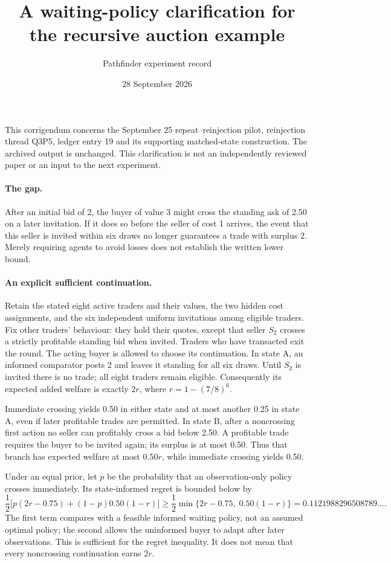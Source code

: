 \documentclass[11pt,a4paper]{article}
\title{A waiting-policy clarification for the recursive auction example}
\author{Pathfinder experiment record}
\date{28 September 2026}
\begin{document}
\maketitle
This corrigendum concerns the September 25 repeat--reinjection pilot,
reinjection thread Q3P5, ledger entry 19 and its supporting matched-state
construction. The archived output is unchanged. This clarification is not
an independently reviewed paper or an input to the next experiment.

\paragraph{The gap.}
After an initial bid of 2, the buyer of value 3 might cross the standing
ask of 2.50 on a later invitation. If it does so before the seller of
cost 1 arrives, the event that this seller is invited within six draws
no longer guarantees a trade with surplus 2. Merely requiring agents to
avoid losses does not establish the written lower bound.

\paragraph{An explicit sufficient continuation.}
Retain the stated eight active traders and their values, the two hidden
cost assignments, and the six independent uniform invitations among
eligible traders. Fix other traders' behaviour: they hold their quotes,
except that seller $S_2$ crosses a strictly profitable standing bid when
invited. Traders who have transacted exit the round.
The acting buyer is allowed to choose its continuation.
In state A, an informed comparator posts 2 and leaves it standing for all
six draws. Until $S_2$ is invited there is no trade; all eight traders
remain eligible. Consequently its expected added welfare is exactly
$2r$, where $r=1-(7/8)^6$.

Immediate crossing yields 0.50 in either state and at most another 0.25
in state A, even if later profitable trades are permitted. In state B,
after a noncrossing first action no seller can profitably cross a bid
below 2.50. A profitable trade requires the buyer to be invited again;
its surplus is at most 0.50. Thus that branch has expected welfare at
most $0.50r$, while immediate crossing yields 0.50.

Under an equal prior, let $p$ be the probability that an observation-only
policy crosses immediately. Its state-informed regret is bounded below by
\[
\frac12\bigl[p(2r-0.75)+(1-p)0.50(1-r)\bigr]
\geq \frac12\min\{2r-0.75,\;0.50(1-r)\}
=0.1121988296508789\ldots.
\]
The first term compares with a feasible informed waiting policy, not an
assumed optimal policy; the second allows the uninformed buyer to adapt
after later observations. This is sufficient for the regret inequality.
It does not mean that every noncrossing continuation earns $2r$.
\end{document}
